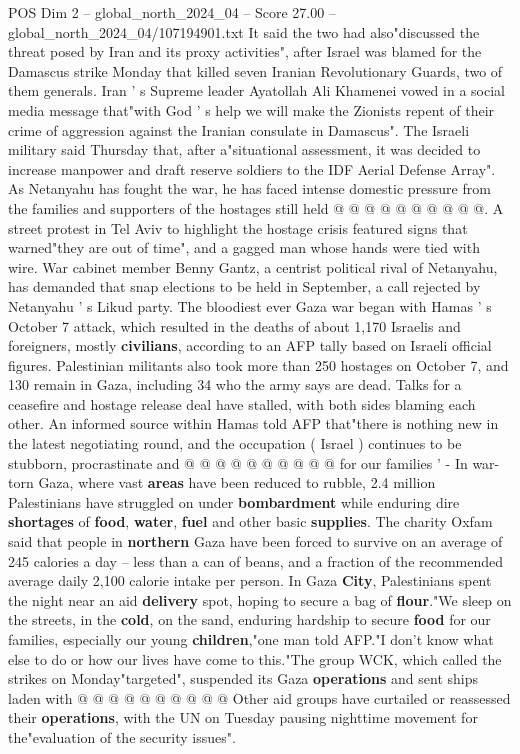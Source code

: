 \begin{textsample}{POS Dim 2 – global\_north\_2024\_04 – Score 27.00 – global\_north\_2024\_04/107194901.txt}
It said the two had also"discussed the threat posed by Iran and its proxy activities", after Israel was blamed for the Damascus strike Monday that killed seven Iranian Revolutionary Guards, two of them generals.
Iran ' s Supreme leader Ayatollah Ali Khamenei vowed in a social media message that"with God ' s help we will make the Zionists repent of their crime of aggression against the Iranian consulate in Damascus".
The Israeli military said Thursday that, after a"situational assessment, it was decided to increase manpower and draft reserve soldiers to the IDF Aerial Defense Array".
As Netanyahu has fought the war, he has faced intense domestic pressure from the families and supporters of the hostages still held @ @ @ @ @ @ @ @ @ @.
A street protest in Tel Aviv to highlight the hostage crisis featured signs that warned"they are out of time", and a gagged man whose hands were tied with wire.
War cabinet member Benny Gantz, a centrist political rival of Netanyahu, has demanded that snap elections to be held in September, a call rejected by Netanyahu ' s Likud party.
The bloodiest ever Gaza war began with Hamas ' s October 7 attack, which resulted in the deaths of about 1,170 Israelis and foreigners, mostly \textbf{civilians}, according to an AFP tally based on Israeli official figures.
Palestinian militants also took more than 250 hostages on October 7, and 130 remain in Gaza, including 34 who the army says are dead.
Talks for a ceasefire and hostage release deal have stalled, with both sides blaming each other.
An informed source within Hamas told AFP that"there is nothing new in the latest negotiating round, and the occupation ( Israel ) continues to be stubborn, procrastinate and @ @ @ @ @ @ @ @ @ @ for our families ' - In war-torn Gaza, where vast \textbf{areas} have been reduced to rubble, 2.4 million Palestinians have struggled on under \textbf{bombardment} while enduring dire \textbf{shortages} of \textbf{food}, \textbf{water}, \textbf{fuel} and other basic \textbf{supplies}.
The charity Oxfam said that people in \textbf{northern} Gaza have been forced to survive on an average of 245 calories a day -- less than a can of beans, and a fraction of the recommended average daily 2,100 calorie intake per person.
In Gaza \textbf{City}, Palestinians spent the night near an aid \textbf{delivery} spot, hoping to secure a bag of \textbf{flour}."We sleep on the streets, in the \textbf{cold}, on the sand, enduring hardship to secure \textbf{food} for our families, especially our young \textbf{children},"one man told AFP."I don't know what else to do or how our lives have come to this."The group WCK, which called the strikes on Monday"targeted", suspended its Gaza \textbf{operations} and sent ships laden with @ @ @ @ @ @ @ @ @ @ Other aid groups have curtailed or reassessed their \textbf{operations}, with the UN on Tuesday pausing nighttime movement for the"evaluation of the security issues".

\end{textsample}
